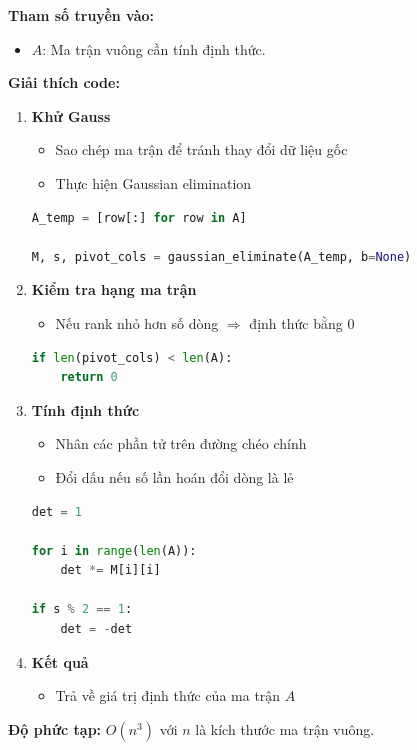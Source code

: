 \documentclass[a4paper,12pt]{report}
\begin{document}
\smallskip

\noindent\textbf{Tham số truyền vào:}
\begin{itemize}
    \item $A$: Ma trận vuông cần tính định thức.
\end{itemize}

\smallskip

\noindent\textbf{Giải thích code:}

\begin{enumerate}

\item \textbf{Khử Gauss}

\begin{itemize}
    \item Sao chép ma trận để tránh thay đổi dữ liệu gốc
    \item Thực hiện Gaussian elimination
\end{itemize}

\begin{lstlisting}[language=Python, caption={Khử Gauss}]
A_temp = [row[:] for row in A]

M, s, pivot_cols = gaussian_eliminate(A_temp, b=None)
\end{lstlisting}

\item \textbf{Kiểm tra hạng ma trận}

\begin{itemize}
    \item Nếu rank nhỏ hơn số dòng $\Rightarrow$ định thức bằng 0
\end{itemize}

\begin{lstlisting}[language=Python, caption={Kiểm tra định thức bằng 0}]
if len(pivot_cols) < len(A):
    return 0
\end{lstlisting}

\item \textbf{Tính định thức}

\begin{itemize}
    \item Nhân các phần tử trên đường chéo chính
    \item Đổi dấu nếu số lần hoán đổi dòng là lẻ
\end{itemize}

\begin{lstlisting}[language=Python, caption={Tính định thức}]
det = 1

for i in range(len(A)):
    det *= M[i][i]

if s % 2 == 1:
    det = -det
\end{lstlisting}

\item \textbf{Kết quả}

\begin{itemize}
    \item Trả về giá trị định thức của ma trận $A$
\end{itemize}

\end{enumerate}
\textbf{Độ phức tạp:} $O(n^3)$ với $n$ là kích thước ma trận vuông.
\end{document}
